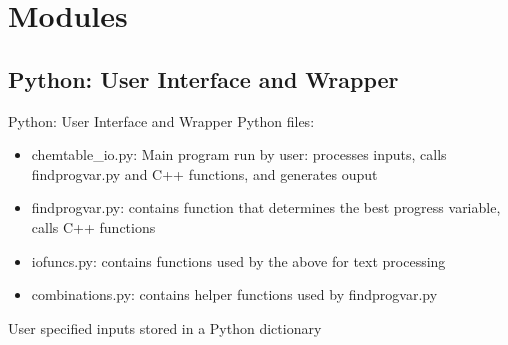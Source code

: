 \documentclass{beamer}
\begin{document}
\section{Modules}

\subsection{Python: User Interface and Wrapper}
\begin{frame}{Python: User Interface and Wrapper}
Python files:
\begin{itemize}
\item chemtable\_io.py: Main program run by user: processes inputs, calls findprogvar.py and C++ functions, and generates ouput %
\item findprogvar.py: contains function that determines the best progress variable, calls C++ functions
\item iofuncs.py: contains functions used by the above for text processing
\item combinations.py: contains helper functions used by findprogvar.py
\end{itemize}
\vspace{12pt}
User specified inputs stored in a Python dictionary


\end{frame}

\end{document}
